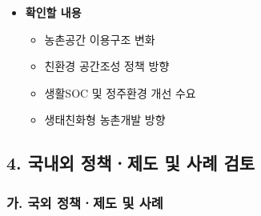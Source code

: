 \begin{itemize}
\begin{itemize}
        \item \textbf{확인할 내용}
        \begin{itemize}
            \item 농촌공간 이용구조 변화
            \item 친환경 공간조성 정책 방향
            \item 생활SOC 및 정주환경 개선 수요
            \item 생태친화형 농촌개발 방향
        \end{itemize}
    \end{itemize}

\end{itemize}

\subsection*{4. 국내외 정책ㆍ제도 및 사례 검토}

\subsubsection*{가. 국외 정책ㆍ제도 및 사례}

